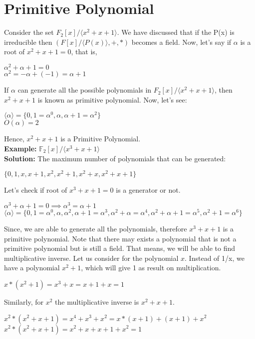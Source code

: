 \documentclass[11pt]{article}
\begin{document}
\section{Primitive Polynomial}
Consider the set $F_2[x]/\langle x^2 + x + 1\rangle$. We have discussed that if the P(x) is irreducible then $(F[x]/\langle P(x) \rangle, +, *)$ becomes a field. Now, let's say if $\alpha$ is a root of $x^2 + x + 1 = 0$, that is,
\begin{center}
    $\alpha^2 + \alpha + 1 = 0$\\
    $\alpha^2 = -\alpha + (-1) = \alpha + 1$
\end{center}
If $\alpha$ can generate all the possible polynomials in $F_2[x]/\langle x^2 + x + 1\rangle$, then $x^2 + x + 1$ is known as primitive polynomial. Now, let's see:
\begin{center}
    $\langle \alpha \rangle = \{0, 1 = \alpha^0, \alpha, \alpha + 1 = \alpha^2\}$\\
    $O(\alpha) = 2$
\end{center}
Hence, $x^2 + x + 1$ is a Primitive Polynomial.\\

\textbf{Example:} $\mathbb{F}_2[x]/\langle x^3 + x + 1 \rangle$\\
\textbf{Solution:} The maximum number of polynomials that can be generated:
\begin{center}
    $\{0, 1, x, x + 1, x^2, x^2 + 1, x^2 + x, x^2 + x + 1\}$
\end{center}
Let's check if root of $x^3 + x + 1 = 0$ is a generator or not.
\begin{center}
    $\alpha^3 + \alpha + 1 = 0 \implies \alpha^3 = \alpha + 1$\\
    \vspace{1mm}
    $\langle \alpha \rangle = \{0, 1 = \alpha^0, \alpha, \alpha^2, \alpha + 1 = \alpha^3, \alpha^2 + \alpha = \alpha^4, \alpha^2 + \alpha + 1 = \alpha^5, \alpha^2 + 1 = \alpha^6\}$
\end{center}
Since, we are able to generate all the polynomials, therefore $x^3 + x + 1$ is a primitive polynomial. Note that there may exists a polynomial that is not a primitive polynomial but is still a field. That means, we will be able to find multiplicative inverse. Let us consider for the polynomial $x$. Instead of 1/x, we have a polynomial $x^2 + 1$, which will give 1 as result on multiplication.
\begin{center}
    $x * (x^2 + 1) = x^3 + x = x + 1 + x = 1$
\end{center}
Similarly, for $x^2$ the multiplicative inverse is $x^2 + x + 1$.
\begin{center}
    $x^2 * (x^2 + x + 1) = x^4 + x^3 + x^2 = x * (x + 1) + (x + 1) + x^2$\\
    $x^2 * (x^2 + x + 1) = x^2 + x + x + 1 + x^2 = 1$
\end{center}
\end{document}
